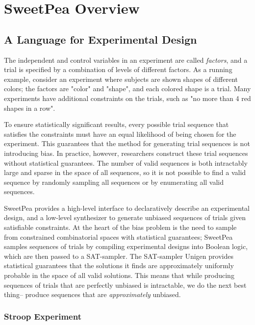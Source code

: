 
\chapter{SweetPea Overview}

\section{A Language for Experimental Design}


The independent and control variables in an experiment are called \textit{factors}, and a trial is specified by a combination of levels of different factors. As a running example, consider an experiment where subjects are shown shapes of different colors; the factors are "color" and "shape", and each colored shape is a trial. Many experiments have additional constraints on the trials, such as "no more than 4 red shapes in a row".


To ensure statistically significant results, every possible trial sequence that satisfies the constraints must have an equal likelihood of being chosen for the experiment. This guarantees that the method for generating trial sequences is not introducing bias. In practice, however, researchers construct these trial sequences without statistical guarantees. The number of valid sequences is both intractably large and sparse in the space of all sequences, so it is not possible to find a valid sequence by randomly sampling all sequences or by enumerating all valid sequences.

SweetPea provides a high-level interface to declaratively describe an experimental design, and a low-level synthesizer to generate unbiased sequences of trials given satisfiable constraints. At the heart of the bias problem is the need to sample from constrained combinatorial spaces with statistical guarantees; SweetPea samples sequences of trials by compiling experimental designs into Boolean logic, which are then passed to a SAT-sampler. The SAT-sampler Unigen %
provides statistical guarantees that the solutions it finds are approximately uniformly probable in the space of all valid solutions. This means that while producing sequences of trials that are perfectly unbiased is intractable, we do the next best thing-- produce sequences that are \emph{approximately} unbiased.

\subsection{Stroop Experiment}

